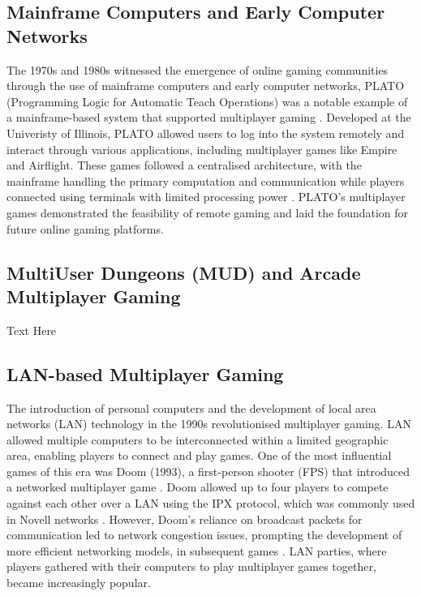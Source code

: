 \subsection{Mainframe Computers and Early Computer Networks}
The 1970s and 1980s witnessed the emergence of online gaming communities through the use of mainframe computers and early computer networks, PLATO (Programming Logic for Automatic Teach Operations) was a notable example of a mainframe-based system that supported multiplayer gaming \cite{arm2006networking}. Developed at the Univeristy of Illinois, PLATO allowed users to log into the system remotely and interact through various applications, including multiplayer games like Empire and Airflight. These games followed a centralised architecture, with the mainframe handling the primary computation and communication while players connected using terminals with limited processing power \cite{arm2006networking}. PLATO's multiplayer games demonstrated the feasibility of remote gaming and laid the foundation for future online gaming platforms. 

\subsection{MultiUser Dungeons (MUD) and Arcade Multiplayer Gaming}
Text Here

\subsection{LAN-based Multiplayer Gaming}
The introduction of personal computers and the development of local area networks (LAN) technology in the 1990s revolutionised multiplayer gaming. LAN allowed multiple computers to be interconnected within a limited geographic area, enabling players to connect and play games. One of the most influential games of this era was Doom (1993), a first-person shooter (FPS) that introduced a networked multiplayer game \cite{arm2006networking}. Doom allowed up to four players to compete against each other over a LAN using the IPX protocol, which was commonly used in Novell networks \cite{Doom}. However, Doom's reliance on broadcast packets for communication led to network congestion issues, prompting the development of more efficient networking models, in subsequent games \cite{arm2006networking}. LAN parties, where players gathered with their computers to play multiplayer games together, became increasingly popular.

